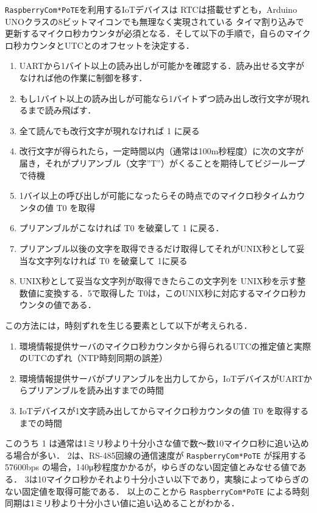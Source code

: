 
{\tt Raspberry\-Com*PoTE}を利用するIoTデバイスは RTCは搭載せずとも，Arduino UNOクラスの8ビットマイコンでも無理なく実現されている タイマ割り込みで更新するマイクロ秒カウンタが必須となる．そして以下の手順で，自らのマイクロ秒カウンタとUTCとのオフセットを決定する．

\begin{enumerate}
\item UARTから1バイト以上の読み出しが可能かを確認する．読み出せる文字がなければ他の作業に制御を移す．
\item もし1バイト以上の読み出しが可能なら1バイトずつ読み出し改行文字が現れるまで読み飛ばす．
\item 全て読んでも改行文字が現れなければ 1 に戻る
\item 改行文字が得られたら，一定時間以内（通常は100m秒程度）に次の文字が届き，それがプリアンブル（文字''T''）がくることを期待してビジーループで待機
\item 1バイ以上の呼び出しが可能になったらその時点でのマイクロ秒タイムカウンタの値 T0 を取得
\item プリアンブルがこなければ T0 を破棄して 1 に戻る．
\item プリアンブル以後の文字を取得できるだけ取得してそれがUNIX秒として妥当な文字列なければ T0 を破棄して 1に戻る
\item UNIX秒として妥当な文字列が取得できたらこの文字列を UNIX秒を示す整数値に変換する．5で取得した T0は，このUNIX秒に対応するマイクロ秒カウンタの値である．
\end{enumerate}

この方法には，時刻ずれを生じる要素として以下が考えられる．

\begin{enumerate}
\item 環境情報提供サーバのマイクロ秒カウンタから得られるUTCの推定値と実際のUTCのずれ（NTP時刻同期の誤差）
\item 環境情報提供サーバがプリアンブルを出力してから，IoTデバイスがUARTからプリアンブルを読み出すまでの時間
\item IoTデバイスが1文字読み出してからマイクロ秒カウンタの値 T0 を取得するまでの時間
\end{enumerate}

このうち 1 は通常は1ミリ秒より十分小さな値で数〜数10マイクロ秒に追い込める場合が多い．
2は、RS-485回線の通信速度が {\tt Raspberry\-Com*PoTE} が採用する 57600bps の場合，140μ秒程度かかるが，ゆらぎのない固定値とみなせる値である．
3は10マイクロ秒かそれより十分小さい以下であり，実験によってゆらぎのない固定値を取得可能である．
以上のことから {\tt Raspberry\-Com*PoTE} による時刻同期は1ミリ秒より十分小さい値に追い込めることがわかる．


